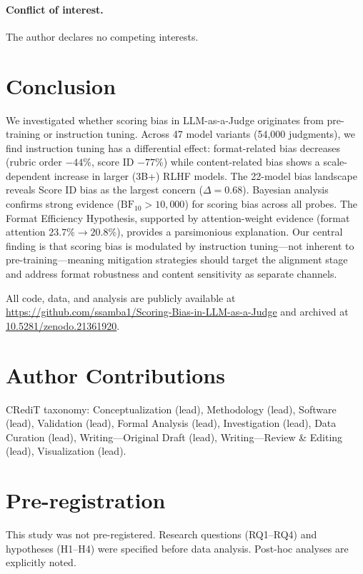 \documentclass[11pt,twocolumn]{article}
\begin{document}
\paragraph{Conflict of interest.}
The author declares no competing interests.

\section{Conclusion}

We investigated whether scoring bias in LLM-as-a-Judge originates from pre-training or instruction tuning. Across 47 model variants (54,000 judgments), we find instruction tuning has a differential effect: format-related bias decreases (rubric order $-44\%$, score ID $-77\%$) while content-related bias shows a scale-dependent increase in larger (3B+) RLHF models. The 22-model bias landscape reveals Score ID bias as the largest concern ($\Delta=0.68$). Bayesian analysis confirms strong evidence ($\text{BF}_{10} > 10{,}000$) for scoring bias across all probes. The Format Efficiency Hypothesis, supported by attention-weight evidence (format attention $23.7\% \to 20.8\%$), provides a parsimonious explanation. Our central finding is that scoring bias is modulated by instruction tuning---not inherent to pre-training---meaning mitigation strategies should target the alignment stage and address format robustness and content sensitivity as separate channels.

All code, data, and analysis are publicly available at \url{https://github.com/ssamba1/Scoring-Bias-in-LLM-as-a-Judge} and archived at \href{https://doi.org/10.5281/zenodo.21361920}{10.5281/zenodo.21361920}.

\section*{Author Contributions}
CRediT taxonomy: Conceptualization (lead), Methodology (lead), Software (lead), Validation (lead), Formal Analysis (lead), Investigation (lead), Data Curation (lead), Writing---Original Draft (lead), Writing---Review \& Editing (lead), Visualization (lead).

\section*{Pre-registration}
This study was not pre-registered. Research questions (RQ1--RQ4) and hypotheses (H1--H4) were specified before data analysis. Post-hoc analyses are explicitly noted.
\end{document}
